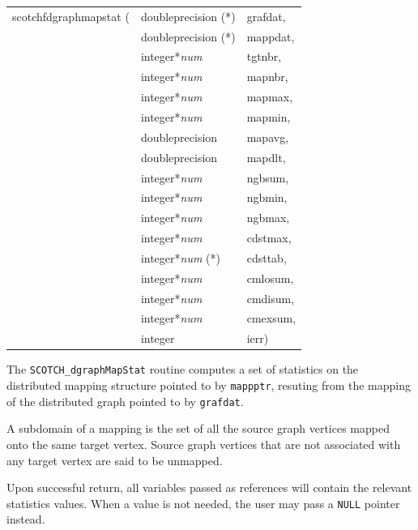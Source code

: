 \begin{itemize}
{\tt\begin{tabular}{l@{}ll}
scotchfdgraphmapstat ( & doubleprecision (*)   & grafdat, \\
                       & doubleprecision (*)   & mappdat, \\
                       & integer*{\it num}     & tgtnbr,  \\
                       & integer*{\it num}     & mapnbr,  \\
                       & integer*{\it num}     & mapmax,  \\
                       & integer*{\it num}     & mapmin,  \\
                       & doubleprecision       & mapavg,  \\
                       & doubleprecision       & mapdlt,  \\
                       & integer*{\it num}     & ngbsum,  \\
                       & integer*{\it num}     & ngbmin,  \\
                       & integer*{\it num}     & ngbmax,  \\
                       & integer*{\it num}     & cdstmax, \\
                       & integer*{\it num} (*) & cdsttab, \\
                       & integer*{\it num}     & cmlosum, \\
                       & integer*{\it num}     & cmdisum, \\
                       & integer*{\it num}     & cmexsum, \\
                       & integer               & ierr)
\end{tabular}}

\progdes

The \texttt{SCOTCH\_dgraphMapStat} routine computes a set of
statistics on the distributed mapping structure pointed to by
\texttt{mappptr}, resuting from the mapping of the distributed graph
pointed to by \texttt{grafdat}.

A subdomain of a mapping is the set of all the source graph vertices
mapped onto the same target vertex. Source graph vertices that are not
associated with any target vertex are said to be unmapped.

Upon successful return, all variables passed as references will
contain the relevant statistics values. When a value is not needed,
the user may pass a \texttt{NULL} pointer instead.


\end{itemize}
